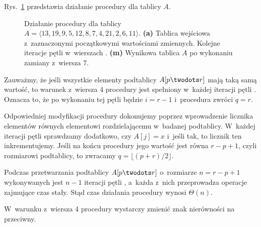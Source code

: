 
\exercise %

\noindent Rys.\ \ref{fig:7.1-1} przedstawia działanie procedury  dla tablicy $A$.
\begin{figure}[!ht]
	\centering 
	\caption{Działanie procedury  dla tablicy $A=\langle13,19,9,5,12,8,7,4,21,2,6,11\rangle$.
{\sffamily\bfseries(a)} Tablica wejściowa z~zaznaczonymi początkowymi wartościami zmiennych.
{\sffamily\bfseries{}} Kolejne iteracje pętli  w~wierszach .
{\sffamily\bfseries(m)} Wynikowa tablica $A$ po wykonaniu zamiany z~wiersza 7.} \label{fig:7.1-1}
\end{figure}

\exercise %

\noindent Zauważmy, że jeśli wszystkie elementy podtablicy $A[p\twodots r]$ mają taką samą wartość, to warunek z~wiersza 4 procedury  jest spełniony w~każdej iteracji pętli .
Oznacza to, że po wykonaniu tej pętli będzie $i=r-1$ i~procedura zwróci $q=r$.

Odpowiedniej modyfikacji procedury dokonujemy poprzez wprowadzenie licznika elementów równych elementowi rozdzielającemu w~badanej podtablicy.
W~każdej iteracji pętli  sprawdzamy dodatkowo, czy $A[j]=x$ i~jeśli tak, to licznik ten inkrementujemy.
Jeśli na końcu procedury jego wartość jest równa $r-p+1$, czyli rozmiarowi podtablicy, to zwracamy $q=\lfloor(p+r)/2\rfloor$.

\exercise %
Podczas przetwarzania podtablicy $A[p\twodots r]$ o~rozmiarze $n=r-p+1$ wykonywanych jest $n-1$ iteracji pętli , a~każda z~nich przeprowadza operacje zajmujące czas stały.
Stąd czas działania procedury  wynosi $\Theta(n)$.

\exercise %
W~warunku z~wiersza 4 procedury  wystarczy zmienić znak nierówności na przeciwny.
